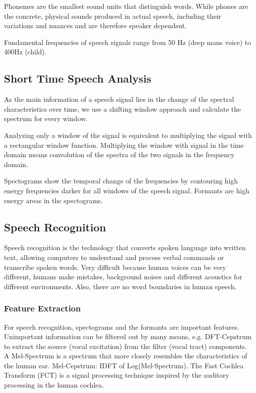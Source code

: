 Phonemes are the smallest sound units that distinguish words. While phones are the concrete,
physical sounds produced in actual speech, including their variations and nuances and are therefore speaker dependent.

Fundamental frequencies of speech signals range from 50 Hz (deep mans voice) to 400Hz (child).

\subsection{Short Time Speech Analysis}
As the main information of a speech signal lies in the change of the spectral characteristics over time,
we use a shifting window approach and calculate the spectrum for every window.

Analyzing only a window of the signal is equivalent to multiplying the signal with a rectangular window function.
Multiplying the window with signal in the time domain means convolution of the spectra of the two signals in the frequency domain.

Spectograms show the temporal change of the frequencies by contouring high energy frequencies darker for all windows of the speech signal.
Formants are high energy areas in the spectograms.

\subsection{Speech Recognition}
Speech recognition is the technology that converts spoken language into written text,
allowing computers to understand and process verbal commands or transcribe spoken words.
Very difficult because human voices can be very different, humans make mistakes, background noises and different acoustics for different environments.
Also, there are no word boundaries in human speech.

\subsubsection{Feature Extraction}
For speech recognition, spectograms and the formants are important features.
Unimportant information can be filtered out by many means, e.g. DFT-Cepstrum to extract the source (vocal excitation) from the filter (vocal tract) components.
A Mel-Spectrum is a spectrum that more closely resembles the characteristics of the human ear.
Mel-Cepstrum: IDFT of Log(Mel-Spectrum). The Fast Cochlea Transform (FCT) is a signal processing technique inspired by the auditory processing in the human cochlea.

